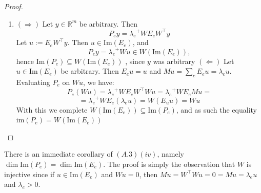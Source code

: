 \documentclass{article}
\theoremstyle{plain}
\numberwithin{equation}{section}
\theoremstyle{definition}
\theoremstyle{remark}
\begin{document}
\begin{lemmaproofbox}
\begin{proof}
\begin{enumerate}[label=(\roman*)]
\item $(\Rightarrow)$ Let $y\in \mathbb{R}^m$ be arbitrary. Then $$P_ey = {\lambda_e}^{+}WE_e W^\top y$$
Let $u:= E_eW^\top y$. Then $u\in \text{Im}(E_e)$, and $$P_ey = {\lambda_e}^{+} Wu\in W(\text{Im}(E_e)), $$
hence $\text{Im}(P_e)\subseteq W(\text{Im}(E_e))$ , since $y$ was arbitrary
\newline $(\Leftarrow)$ Let $u\in \text{Im}(E_e)$ be arbitrary. Then $E_e u = u$ and $Mu = \sum_{e}E_eu=  \lambda_e u$. Evaluating $P_e$ on $Wu$, we have: $$P_e(Wu) = {\lambda_e}^{+}WE_eW^\top Wu = {\lambda_e}^{+}WE_eMu = $$
$$= {\lambda_e}^{+} WE_e(\lambda_eu) = W(E_uu) = Wu$$
With this we complete $W(\text{Im}(E_e))\subseteq \text{Im}(P_e)$, and as such the equality $\text{im}(P_e) = W(\text{Im}(E_e))$ 

        \end{enumerate}
    \end{proof}
\end{lemmaproofbox}
There is an immediate corollary of $(A.3)(iv)$, namely $\dim \text{Im}(P_e) = \dim \text{Im}(E_e)$. The proof is simply the observation that $W$ is injective since if $u\in \text{Im}(E_e)$ and $Wu=0$, then $Mu = W^\top W u = 0 = Mu = \lambda_e u$ and $\lambda_e>0$. 
\end{document}
